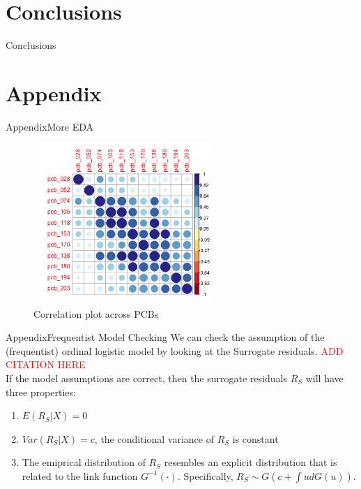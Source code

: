 \documentclass{beamer}\usepackage[]{graphicx}\usepackage[]{color}
\begin{document}

\section{Conclusions}
\begin{frame}{Conclusions}
\end{frame}

\appendix
\section{Appendix}
\begin{frame}{Appendix}{More EDA}
\begin{figure}
  \centering
  \includegraphics[width=0.6\textwidth]{corrplot_PCB.png}
\caption{Correlation plot across PCBs}
\label{fig:corrPCB}
\end{figure}
\end{frame}
\begin{frame}{Appendix}{Frequentist Model Checking}
We can check the assumption of the (frequentist) ordinal logistic model by looking at the Surrogate residuals. \textcolor{red}{ADD CITATION HERE}\\
\medskip
If the model assumptions are correct, then the surrogate residuals $R_S$ will have three properties:
\begin{enumerate}
 \item $E(R_S|X)=0$
 \item $Var(R_S|X)=c$, the conditional variance of $R_S$ is constant
 \item The emiprical distribution of $R_S$ resembles an explicit distribution that is related to the link function $G^{-1}(\cdot)$. Specifically, $R_S\sim G(c+\int ud G(u))$.
\end{enumerate}
\end{frame}
\end{document}
